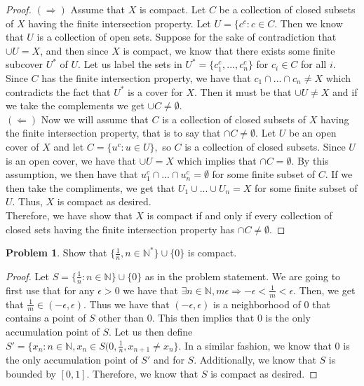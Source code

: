 \documentclass[11pt]{article}
\theoremstyle{definition}
\newtheorem{problem}{Problem}
\newcommand{\N}{\mathbb{N}}
\newcommand{\e}{\epsilon}
\begin{document}
\begin{proof}
$(\Rightarrow)$ Assume that $X$ is compact. Let $C$ be a collection of closed subsets of $X$ having the finite intersection property. Let $U = \{ c^c: c\in C$. Then we know that $U$ is a collection of open sets. Suppose for the sake of contradiction that $\cup U = X$, and then since $X$ is compact, we know that there exists some finite subcover $U^*$ of $U$. Let us label the sets in $U^* = \{c^c_1, ..., c^c_n\}$ for $c_i \in C$ for all $i$. Since $C$ has the finite intersection property, we have that $c_1 \cap ... \cap c_n \neq X$ which contradicts the fact that $U^*$ is a cover for $X$. Then it must be that $\cup U \neq X$ and if we take the complements we get $\cup C \neq \emptyset.$\\
$(\Leftarrow)$ Now we will assume that $C$ is a collection of closed subsets of $X$ having the finite intersection property, that is to say that $\cap C \neq \emptyset$. Let $U$ be an open cover of $X$ and let $C = \{u^c: u \in U\},$ so $C$ is a collection of closed subsets. Since $U$ is an open cover, we have that $\cup U = X$ which implies that $\cap C = \emptyset.$ By this assumption, we then have that $u_1^c \cap ... \cap u_n^c = \emptyset$ for some finite subset of $C$. If we then take the compliments, we get that $U_1 \cup ... \cup U_n = X$ for some finite subset of $U$. Thus, $X$ is compact as desired.\\
Therefore, we have show that $X$ is compact if and only if every collection of closed sets having the finite intersection property has $\cap C\neq \emptyset.$
\end{proof}

\pagebreak
\begin{problem}
    Show that $\{\frac{1}{n}, n \in \N^*\}\cup \{0\}$ is compact.
\end{problem}

\begin{proof}
    Let $S = \{\frac{1}{n}: n \in \N\} \cup \{0\}$ as in the problem statement. We are going to first use that for any $\e > 0$ we have that $\exists n \in \N, m\e \Rightarrow -\e < \frac{1}{m} < \e$. Then, we get that $\frac{1}{m}\in (-\e, \e)$. Thus we have that $(-\e, \e)$ is a neighborhood of $0$ that contains a point of $S$ other than $0$. This then implies that $0$ is the only accumulation point of $S$. Let us then define $S' = \{x_n: n\in \N, x_n \in S(0, \frac{1}{n}, x_{n + 1}\neq x_n\}$. In a similar fashion, we know that $0$ is the only accumulation point of $S'$ and for $S$. Additionally, we know that $S$ is bounded by $[0, 1]$. Therefore, we know that $S$ is compact as desired.
\end{proof}
\end{document}
